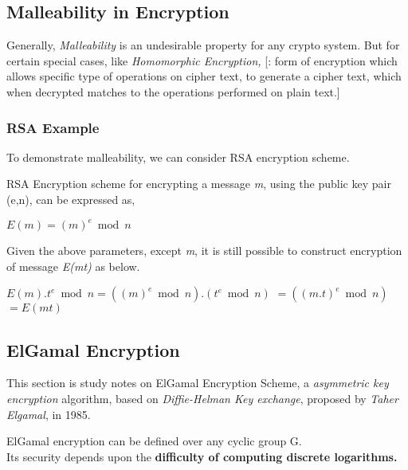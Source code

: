 \documentclass[12pt]{article}
\begin{document}
\subsection{Malleability in Encryption}


Generally, \textit{Malleability} is an undesirable property for any crypto system. But for certain special 
cases, like \textit{Homomorphic Encryption,} [: form of encryption which allows specific type of operations on
cipher text, to generate a cipher text, which when decrypted matches to the operations performed on plain 
text.]

\subsubsection{RSA Example}
To demonstrate malleability, we can consider RSA encryption scheme.

\bigskip

RSA Encryption scheme for encrypting a message \textit{m}, using the public key pair (e,n), can be expressed 
as,
\bigskip

\begin{center}
$E(m) = (m)^e \bmod n$
\end{center}

Given the above parameters, except \textit{m}, it is still possible to construct encryption of message \textit{E(mt)} as below.
\bigskip

\begin{center}
$ E(m).t^e \bmod n = ((m)^e \bmod n).(t^e \bmod n)$
$                       = ((m.t)^e \bmod n)$
$                       = E(mt)$
\end{center}



\pagebreak
\vspace*{\fill}
\begin{center}
\section{ElGamal Encryption}
This section is study notes on ElGamal Encryption Scheme, a \textit{asymmetric key encryption} algorithm,
based on \textit{Diffie-Helman Key exchange}, proposed by \textit{Taher Elgamal}, in 1985.
\end{center}
ElGamal encryption can be defined over any cyclic group G. \\
Its security depends upon the \textbf{difficulty of computing discrete logarithms.}
\vspace*{\fill}
\pagebreak
\end{document}

